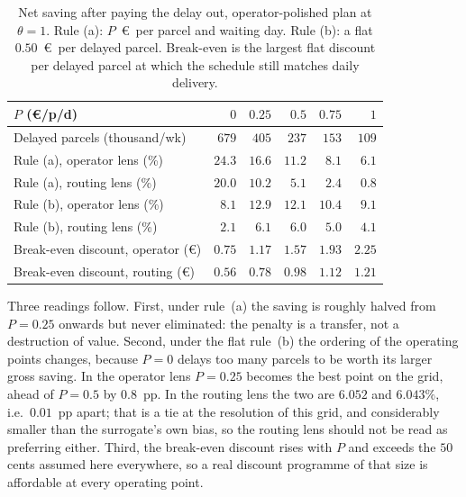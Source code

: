 \documentclass[11pt,a4paper]{article}
\begin{document}
\begin{table}[h]
  \centering
  \caption{Net saving after paying the delay out, operator-polished plan at
  $\theta = 1$. Rule (a): $P$~\euro\ per parcel and waiting day. Rule (b): a
  flat $0.50$~\euro\ per delayed parcel. Break-even is the largest flat
  discount per delayed parcel at which the schedule still matches daily
  delivery.}
  \label{tab:supp_discount}
  \small
  \begin{tabular}{l rrrrr}
    \toprule
    $P$ (\euro/p/d) & $0$ & $0.25$ & $0.5$ & $0.75$ & $1$ \\
    \midrule
    Delayed parcels (thousand/wk)      & $679$ & $405$ & $237$ & $153$ & $109$ \\
    \addlinespace
    Rule (a), operator lens (\%)       & $24.3$ & $16.6$ & $11.2$ & $8.1$ & $6.1$ \\
    Rule (a), routing lens (\%)        & $20.0$ & $10.2$ & $5.1$  & $2.4$ & $0.8$ \\
    \addlinespace
    Rule (b), operator lens (\%)       & $8.1$ & $\mathbf{12.9}$ & $12.1$ & $10.4$ & $9.1$ \\
    Rule (b), routing lens (\%)        & $2.1$ & $\mathbf{6.1}$  & $6.0$  & $5.0$  & $4.1$ \\
    \addlinespace
    Break-even discount, operator (\euro) & $0.75$ & $1.17$ & $1.57$ & $1.93$ & $2.25$ \\
    Break-even discount, routing (\euro)  & $0.56$ & $0.78$ & $0.98$ & $1.12$ & $1.21$ \\
    \bottomrule
  \end{tabular}
\end{table}

Three readings follow. First, under rule~(a) the saving is roughly halved from
$P = 0.25$ onwards but never eliminated: the penalty is a transfer, not a
destruction of value. Second, under the flat rule~(b) the ordering of the
operating points changes, because $P = 0$ delays too many parcels to be worth
its larger gross saving. In the operator lens $P = 0.25$ becomes the best point
on the grid, ahead of $P = 0.5$ by $0.8$~pp. In the routing lens the two are
$6.052$ and $6.043\%$, i.e.\ $0.01$~pp apart; that is a tie at the resolution
of this grid, and considerably smaller than the surrogate's own bias, so the
routing lens should not be read as preferring either. Third, the break-even
discount rises with $P$ and exceeds the $50$ cents assumed here everywhere, so
a real discount programme of that size is affordable at every operating point.
\end{document}
